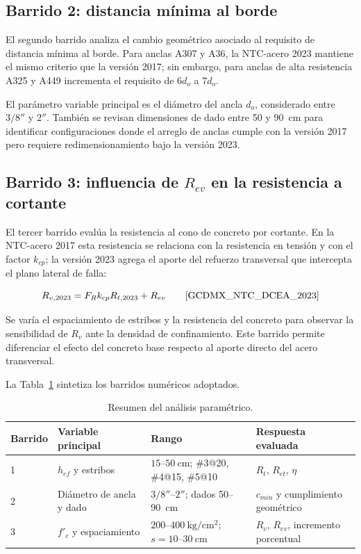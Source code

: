 \subsection{Barrido 2: distancia mínima al borde}

El segundo barrido analiza el cambio geométrico asociado al requisito de distancia mínima al borde.
Para anclas A307 y A36, la NTC-acero 2023 mantiene el mismo criterio que la versión 2017; sin
embargo, para anclas de alta resistencia A325 y A449 incrementa el requisito de $6d_o$ a $7d_o$.

El parámetro variable principal es el diámetro del ancla $d_o$, considerado entre $3/8''$ y $2''$.
También se revisan dimensiones de dado entre 50 y 90~cm para identificar configuraciones donde el
arreglo de anclas cumple con la versión 2017 pero requiere redimensionamiento bajo la versión 2023.

\subsection{Barrido 3: influencia de \texorpdfstring{$R_{ev}$}{Rev} en la resistencia a cortante}

El tercer barrido evalúa la resistencia al cono de concreto por cortante. En la NTC-acero 2017 esta
resistencia se relaciona con la resistencia en tensión y con el factor $k_{cp}$; la versión 2023
agrega el aporte del refuerzo transversal que intercepta el plano lateral de falla:

\begin{equation}
  R_{v,2023}=F_R k_{cp}R_{t,2023}+R_{ev}
  \qquad \text{\cite{GCDMX_NTC_DCEA_2023}}
  \label{eq:met_Rv2023}
\end{equation}

Se varía el espaciamiento de estribos y la resistencia del concreto para observar la sensibilidad
de $R_v$ ante la densidad de confinamiento. Este barrido permite diferenciar el efecto del concreto
base respecto al aporte directo del acero transversal.

La Tabla~\ref{tab:barridos_metodologia} sintetiza los barridos numéricos adoptados.

\begin{table}[H]
  \centering
  \caption{Resumen del análisis paramétrico.}
  \label{tab:barridos_metodologia}
  \begin{tabular}{p{} p{} p{} p{}}
    \toprule
    \textbf{Barrido} & \textbf{Variable principal} & \textbf{Rango} & \textbf{Respuesta evaluada} \\
    \midrule
    1 & $h_{ef}$ y estribos & $15$--$50~\mathrm{cm}$; \#3@20, \#4@15, \#5@10 & $R_t$, $R_{et}$, $\eta$ \\
    2 & Diámetro de ancla y dado & $3/8''$--$2''$; dados 50--90~cm & $c_{min}$ y cumplimiento geométrico \\
    3 & $f'_c$ y espaciamiento & $200$--$400~\mathrm{kg/cm^2}$; $s=10$--$30~\mathrm{cm}$ & $R_v$, $R_{ev}$, incremento porcentual \\
    \bottomrule
  \end{tabular}
\end{table}

